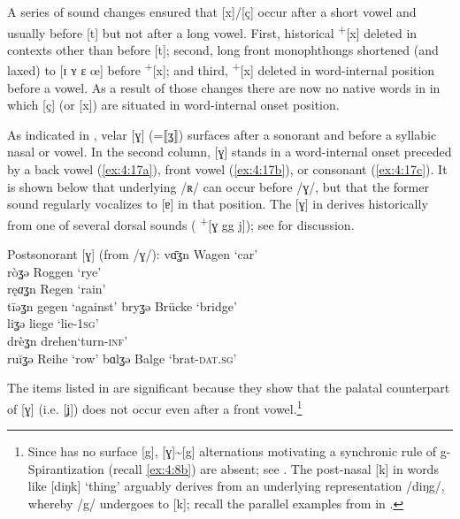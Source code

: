 A series of sound changes ensured that [x]/[ç] occur after a short vowel and usually before [t] but not after a long vowel. First, historical \textsuperscript{+}[x] deleted in contexts other than before [t]; second, long front monophthongs shortened (and laxed) to [ɪ ʏ ɛ œ] before \textsuperscript{+}[x]; and third, \textsuperscript{+}[x] deleted in word-internal position before a vowel. As a result of those changes there are now no native words in  in which [ç] (or [x]) are situated in word-internal onset position.

As indicated in , velar [ɣ] (=⟦ʓ⟧) surfaces after a sonorant and before a syllabic nasal or vowel. In the second column, [ɣ] stands in a word-internal onset preceded by a back vowel (\ref{ex:4:17a}), front vowel (\ref{ex:4:17b}), or consonant (\ref{ex:4:17c}). It is shown below that underlying /ʀ/ can occur before /ɣ/, but that the former sound regularly vocalizes to [ɐ] in that position. The [ɣ] in  derives historically from one of several dorsal sounds ( \textsuperscript{+}[ɣ gg j]); see \citet{Hall2014a} for discussion.

\ea%
      Postsonorant [ɣ] (from /ɣ/):\label{ex:4:17}
 \ea\label{ex:4:17a} vɑ̄ʓn           \tab [vɑː.ɣn̩] \tab  Wagen \tab  ‘car’  \\
     ròʓə           \tab [ʀɔ.ɣə]   \tab Roggen \tab ‘rye’   \\
     rę\textit{ɑ}ʓn \tab [ʀeɐ.ɣn̩] \tab  Regen \tab  ‘rain’ \\
     tīəʓn          \tab [tiːə.ɣn̩]\tab  gegen \tab  ‘against’
 \ex\label{ex:4:17b} bryʓə          \tab [bʀʏ.ɣə]  \tab Brücke \tab ‘bridge’  \\
     liʓə           \tab [lɪ.ɣə]   \tab liege  \tab ‘lie-\textsc{1sg}’  \\
     drèʓn          \tab [dʀɛ.ɣn̩] \tab  drehen\tab  ‘turn-\textsc{inf}’\\
     ruĭʓə          \tab [ʀui.ɣə]  \tab Reihe  \tab ‘row’  
 \ex\label{ex:4:17c}  bɑlʓə         \tab [bɑl.ɣə]  \tab Balge  \tab ‘brat-\textsc{dat}.\textsc{sg}’  
 \z
\z 

The items listed in  are significant because they show that the palatal counterpart of [ɣ] (i.e. [ʝ]) does not occur even after a front vowel.\footnote{\textrm{Since  has no surface [g], [ɣ]{\textasciitilde}[g] alternations motivating a synchronic rule of g-Spirantization (recall \ref{ex:4:8b}) are absent; see \citet[43]{Holthausen1886}. The post-nasal [k] in words like [diŋk] ‘thing’ arguably derives from an underlying representation /diŋg/, whereby /g/ undergoes  to [k]; recall the parallel examples from  in .}}

